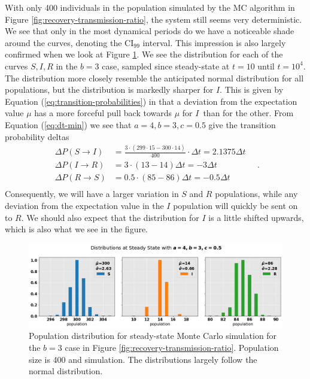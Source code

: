 \documentclass[]{article}
\begin{document}
With only 400 individuals in the population simulated by the MC algorithm in Figure \ref{fig:recovery-transmission-ratio}, the system still seems very deterministic. We see that only in the most dynamical periods do we have a noticeable shade around the curves, denoting the CI$_{99}$ interval. This impression is also largely confirmed when we look at Figure \ref{fig:recovery-transmission-ratio-distribution}. We see the distribution for each of the curves $S, I, R$ in the $b=3$ case, sampled since steady-state at $t=10$ until $t=10^4$. The distribution more closely resemble the anticipated normal distribution for all populations, but the distribution is markedly sharper for $I$. This is given by Equation (\ref{eq:transition-probabilities}) in that a deviation from the expectation value $\mu$ has a more forceful pull back towards $\mu$ for $I$ than for the other. From Equation (\ref{eq:dt-min}) we see that $a=4, b=3, c=0.5$ give the transition probability deltas
\begin{equation}
\begin{aligned}
	\Delta P(S \rightarrow I) &= \frac{3 \cdot (299 \cdot 15 - 300 \cdot 14)}{400} \cdot \Delta t = 2.1375 \Delta t \\		
	\Delta P(I \rightarrow R) &= 3 \cdot (13 - 14) \Delta t = - 3\Delta t \\	
	\Delta P(R \rightarrow S) &= 0.5 \cdot (85-86) \Delta t = - 0.5\Delta t \\		
\end{aligned} \quad .
\end{equation}
Consequently, we will have a larger variation in $S$ and $R$ populations, while any deviation from the expectation value in the $I$ population will quickly be sent on to $R$. We should also expect that the distribution for $I$ is a little shifted upwards, which is also what we see in the figure.

\begin{figure}[!h]
	\centering
	\includegraphics[width=1\linewidth]{./figs/recovery-transmission-ratio-distribution.png}
	\caption{Population distribution for steady-state Monte Carlo simulation for the $b=3$ case in Figure \ref{fig:recovery-transmission-ratio}. Population size is 400 and simulation. The distributions largely follow the normal distribution.}
	\label{fig:recovery-transmission-ratio-distribution}
\end{figure}
\end{document}
